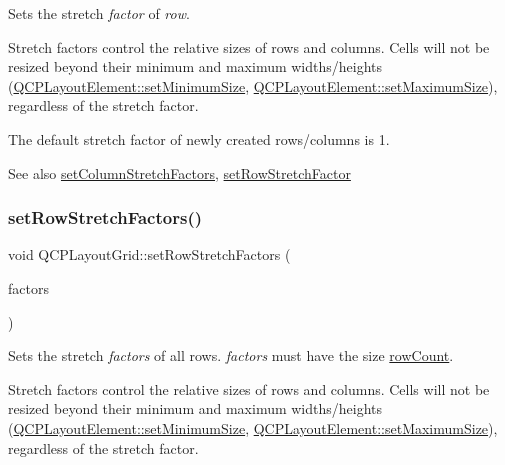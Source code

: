Sets the stretch {\itshape factor} of {\itshape row}.

Stretch factors control the relative sizes of rows and columns. Cells will not be resized beyond their minimum and maximum widths/heights (\hyperlink{class_q_c_p_layout_element_a5dd29a3c8bc88440c97c06b67be7886b}{Q\+C\+P\+Layout\+Element\+::set\+Minimum\+Size}, \hyperlink{class_q_c_p_layout_element_a74eb5280a737ab44833d506db65efd95}{Q\+C\+P\+Layout\+Element\+::set\+Maximum\+Size}), regardless of the stretch factor.

The default stretch factor of newly created rows/columns is 1.

\begin{DoxySeeAlso}{See also}
\hyperlink{class_q_c_p_layout_grid_a6c2591d1a7e2534ce036989543b49e57}{set\+Column\+Stretch\+Factors}, \hyperlink{class_q_c_p_layout_grid_a7b0273de5369bd93d942edbaf5b166ec}{set\+Row\+Stretch\+Factor} 
\end{DoxySeeAlso}
\mbox{\label{class_q_c_p_layout_grid_a200b45f9c908f96ebadaa3c8d87a2782}} 
\subsubsection{\texorpdfstring{set\+Row\+Stretch\+Factors()}{setRowStretchFactors()}}
{\footnotesize\ttfamily void Q\+C\+P\+Layout\+Grid\+::set\+Row\+Stretch\+Factors (\begin{DoxyParamCaption}\item[{const Q\+List$<$ double $>$ \&}]{factors }\end{DoxyParamCaption})}

Sets the stretch {\itshape factors} of all rows. {\itshape factors} must have the size \hyperlink{class_q_c_p_layout_grid_a19c66fd76cbce58a8e94f33797e0c0aa}{row\+Count}.

Stretch factors control the relative sizes of rows and columns. Cells will not be resized beyond their minimum and maximum widths/heights (\hyperlink{class_q_c_p_layout_element_a5dd29a3c8bc88440c97c06b67be7886b}{Q\+C\+P\+Layout\+Element\+::set\+Minimum\+Size}, \hyperlink{class_q_c_p_layout_element_a74eb5280a737ab44833d506db65efd95}{Q\+C\+P\+Layout\+Element\+::set\+Maximum\+Size}), regardless of the stretch factor.

